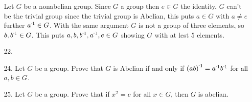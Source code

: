 \begin{mdframed}[style=darkAnswer,frametitle={Joe Starr}]
Let $G$ be a nonabelian group. Since $G$ a group then $e\in G$ the identity. $G$
can't be the trivial group since the trivial group is Abelian, this puts 
$a\in G$ with $a\neq e$ further $\inv{a}\in G$. With the same argument $G$ is 
not a group of three elements, so $b,\inv{b}\in G$. This puts 
$a,b,\inv{b},\inv{a},e\in G$ showing $G$ with at lest 5 elements.
\end{mdframed}
\newpage
\begin{mdframed}[style=darkQuesion]
  22.
\end{mdframed}

\begin{mdframed}[style=darkAnswer,frametitle={Joe Starr}]

\end{mdframed}
\newpage
\begin{mdframed}[style=darkQuesion]
  24. Let $G$ be a group. Prove that $G$ is Abelian if and only if 
  $\inv{\lrp{ab}}=\inv{a}\inv{b}$ for all $a,b\in G$. 
\end{mdframed}

\begin{mdframed}[style=darkAnswer,frametitle={Joe Starr}]
\end{mdframed}
\newpage
\begin{mdframed}[style=darkQuesion]
  25. Let $G$ be a group. Prove that if $x^2=e$ for all $x\in G$, then $G$ is 
  abelian. 
\end{mdframed}

